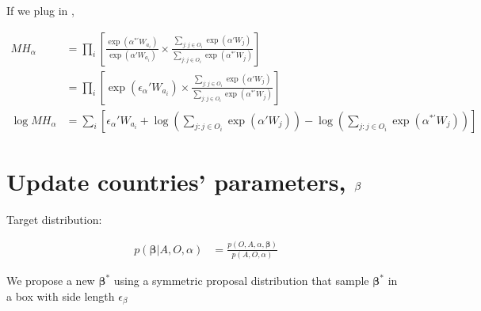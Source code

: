 \documentclass[12pt]{article}
\begin{document}
If we plug in ,

\begin{align}
MH_\alpha &= \prod_i \left[ \frac{\exp(\alpha^{*\prime} W_{a_i})}{\exp(\alpha' W_{a_i})} \times \frac{\sum\limits_{j:j \in O_i} \exp(\alpha' W_j)}{\sum\limits_{j:j \in O_i} \exp(\alpha^{*\prime}W_j)} \right] \\
&= \prod_i \left[ \exp(\epsilon_\alpha ' W_{a_i}) \times \frac{\sum\limits_{j:j \in O_i} \exp(\alpha' W_j)}{\sum\limits_{j:j \in O_i} \exp(\alpha^{*\prime}W_j)} \right] \\
\log MH_\alpha &= \sum_i \left[ \epsilon_\alpha' W_{a_i} + \log\left(\sum\limits_{j:j \in O_i} \exp(\alpha' W_j)\right) - \log\left(\sum\limits_{j:j \in O_i} \exp(\alpha^{*\prime} W_j)\right) \right]
\end{align}

\section{Update countries' parameters, \texorpdfstring{$\boldmath\beta$}{}}

Target distribution:

\begin{align}
p(\bm{\beta}|A, O, \alpha) &= \frac{p(O, A, \alpha, \bm{\beta})}{p(A, O, \alpha)}
\end{align}

We propose a new $\bm{\beta}^*$ using a symmetric proposal distribution that sample $\bm{\beta}^*$ in a box with side length $\epsilon_\beta$
\end{document}

